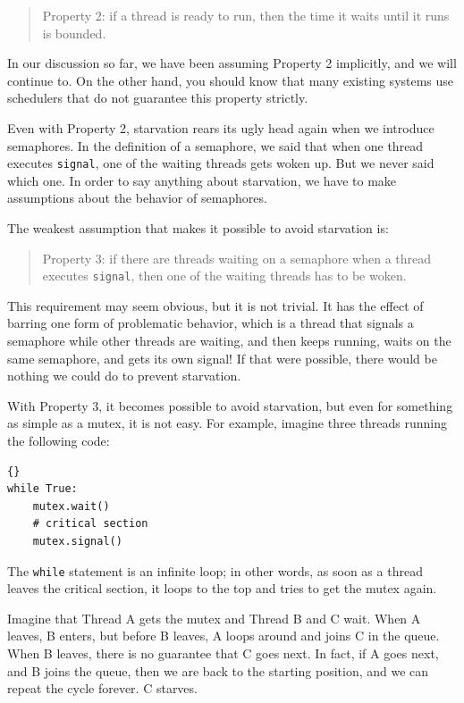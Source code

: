 \documentclass{book}
\begin{document}
\begin{quote}
Property 2: if a thread is ready to run, then the time it
waits until it runs is bounded.
\end{quote}

In our discussion so far, we have been assuming Property 2
implicitly, and we will continue to.  On the other hand,
you should know that many existing systems use schedulers
that do not guarantee this property strictly.

Even with Property 2, starvation rears its ugly head again
when we introduce semaphores.  In the definition of a semaphore,
we said that when one thread executes {\tt signal}, one of
the waiting threads gets woken up.  But we never said which one.
In order to say anything about starvation, we have to
make assumptions about the behavior of semaphores.

The weakest assumption that makes it possible to avoid
starvation is:

\begin{quote}
Property 3: if there are threads waiting on a semaphore when
a thread executes {\tt signal}, then one of the waiting threads
has to be woken.
\end{quote}

This requirement may seem obvious, but it is not trivial.  It has the
effect of barring one form of problematic behavior, which is a thread
that signals a semaphore while other threads are waiting, and then
keeps running, waits on the same semaphore, and gets its own signal!
If that were possible, there would be nothing we
could do to prevent starvation.

With Property 3, it becomes possible to avoid starvation, but
even for something as simple as a mutex, it is not easy.
For example, imagine three threads
running the following code:

\begin{lstlisting}[title={Mutex loop}]{}
while True:
    mutex.wait()
    # critical section 
    mutex.signal()
\end{lstlisting}

The {\tt while} statement is an infinite loop; in other words,
as soon as a thread leaves the critical section, it loops to the
top and tries to get the mutex again.

Imagine that Thread A gets the mutex and Thread B and C wait.
When A leaves, B enters, but before B leaves, A loops around
and joins C in the queue.  When B leaves, there is no guarantee
that C goes next.  In fact, if A goes next, and B joins the
queue, then we are back to the starting position, and we can
repeat the cycle forever.  C starves.
\end{document}
